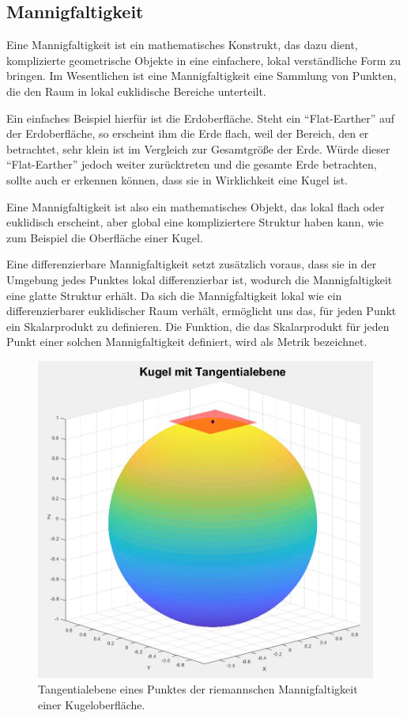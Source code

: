 \subsection{Mannigfaltigkeit}
Eine Mannigfaltigkeit ist ein mathematisches Konstrukt, das dazu dient, komplizierte geometrische Objekte in eine einfachere, lokal verständliche Form zu bringen.
Im Wesentlichen ist eine Mannigfaltigkeit eine Sammlung von Punkten, die den Raum in lokal euklidische Bereiche unterteilt. 

Ein einfaches Beispiel hierfür ist die Erdoberfläche.
Steht ein ``Flat-Earther'' auf der Erdoberfläche, so erscheint ihm die Erde flach, weil der Bereich, den er betrachtet, sehr klein ist im Vergleich zur Gesamtgröße der Erde.
Würde dieser ``Flat-Earther'' jedoch weiter zurücktreten und die gesamte Erde betrachten, sollte auch er erkennen können, dass sie in Wirklichkeit eine Kugel ist.

Eine Mannigfaltigkeit ist also ein mathematisches Objekt, das lokal flach oder euklidisch erscheint, aber global eine kompliziertere Struktur haben kann, wie zum Beispiel die Oberfläche einer Kugel.

Eine differenzierbare Mannigfaltigkeit setzt zusätzlich voraus, dass sie in der Umgebung jedes Punktes lokal differenzierbar ist, wodurch die Mannigfaltigkeit eine glatte Struktur erhält.
Da sich die Mannigfaltigkeit lokal wie ein differenzierbarer euklidischer Raum verhält, ermöglicht uns das, für jeden Punkt ein Skalarprodukt zu definieren.
Die Funktion, die das Skalarprodukt für jeden Punkt einer solchen Mannigfaltigkeit definiert, wird als Metrik bezeichnet.

\begin{figure}
	\centering
	\includegraphics[width=1\linewidth]{papers/geodaeten/Abbildungen/MetrischerTensor/Tangentialebene}
	\caption{Tangentialebene eines Punktes der riemannschen Mannigfaltigkeit einer Kugeloberfläche.}
	\label{geodaeten:figure:MetrischerTensor:Tangentialebene}
\end{figure}

